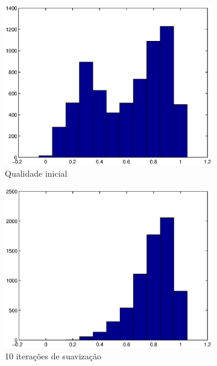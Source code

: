 \documentclass[11pt]{article}
\begin{document}
		\begin{figure}
			\centering
			\begin{subfigure}[b]{0.45\textwidth}
				\centering
				\includegraphics[width=\textwidth]{figures/0iter_torus}
				\caption{Qualidade inicial}				
			\end{subfigure}
			\begin{subfigure}[b]{0.45\textwidth}
				\centering
				\includegraphics[width=\textwidth]{figures/10iter_torus}
				\caption{10 iterações de suavização}				
			\end{subfigure}
			\begin{subfigure}[b]{0.45\textwidth}
				\centering

\end{subfigure}
\end{figure}
\end{document}
